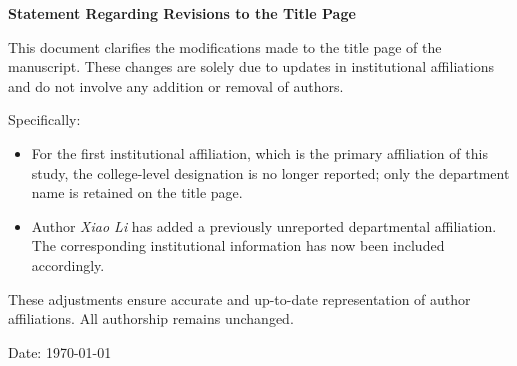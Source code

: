 \documentclass[12pt]{article}
\begin{document}
\begin{center}
    \textbf{\Large Statement Regarding Revisions to the Title Page}
\end{center}

\vspace{1em}

This document clarifies the modifications made to the title page of the manuscript. These changes are solely due to updates in institutional affiliations and do not involve any addition or removal of authors.

Specifically:
\begin{itemize}
    \item For the first institutional affiliation, which is the primary affiliation of this study, the college-level designation is no longer reported; only the department name is retained on the title page.
    \item Author \textit{Xiao Li} has added a previously unreported departmental affiliation. The corresponding institutional information has now been included accordingly.
\end{itemize}

These adjustments ensure accurate and up-to-date representation of author affiliations. All authorship remains unchanged.

\vfill

\begin{flushright}
Date: \today \\
\end{flushright}
\end{document}

